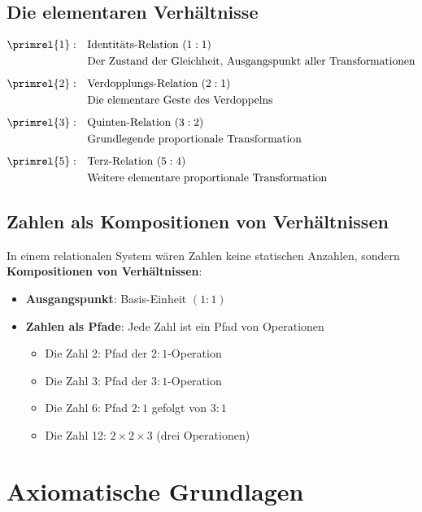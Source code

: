 	\subsection{Die elementaren Verhältnisse}
	
	\begin{definition}
		\begin{align}
			\primrel{1}: \quad &\text{Identitäts-Relation } (1:1) \\
			&\text{Der Zustand der Gleichheit, Ausgangspunkt aller Transformationen} \\[0.5em]
			\primrel{2}: \quad &\text{Verdopplungs-Relation } (2:1) \\
			&\text{Die elementare Geste des Verdoppelns} \\[0.5em]
			\primrel{3}: \quad &\text{Quinten-Relation } (3:2) \\
			&\text{Grundlegende proportionale Transformation} \\[0.5em]
			\primrel{5}: \quad &\text{Terz-Relation } (5:4) \\
			&\text{Weitere elementare proportionale Transformation}
		\end{align}
	\end{definition}
	
	\subsection{Zahlen als Kompositionen von Verhältnissen}
	
	In einem relationalen System wären Zahlen keine statischen Anzahlen, sondern \textbf{Kompositionen von Verhältnissen}:
	
	\begin{itemize}
		\item \textbf{Ausgangspunkt}: Basis-Einheit $(1:1)$
		\item \textbf{Zahlen als Pfade}: Jede Zahl ist ein Pfad von Operationen
		\begin{itemize}
			\item Die Zahl 2: Pfad der $2:1$-Operation
			\item Die Zahl 3: Pfad der $3:1$-Operation  
			\item Die Zahl 6: Pfad $2:1$ gefolgt von $3:1$
			\item Die Zahl 12: $2 \times 2 \times 3$ (drei Operationen)
		\end{itemize}
	\end{itemize}
	
	\section{Axiomatische Grundlagen}
	
